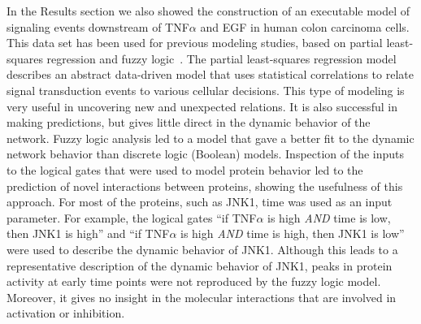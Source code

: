 \documentclass{bmcart}
\begin{document}
In the Results section we also showed the construction of an executable model
of signaling events downstream of
TNF$\alpha$ and EGF in human colon carcinoma cells. This data set has been used for
previous modeling studies, based on partial least-squares regression and fuzzy 
logic~\cite{pathway-leastsquare,pathway-fuzzy}.
The partial least-squares regression model describes an abstract data-driven model 
that uses statistical correlations
to relate signal transduction events to various cellular decisions. This type of modeling is
very useful in uncovering new and unexpected relations. It is also successful in making
predictions, but gives little direct in the dynamic behavior of the network. Fuzzy
logic analysis led to a model that gave a better fit to the dynamic network behavior than
discrete logic (Boolean) models. Inspection of the inputs to the logical gates that were used
to model protein behavior led to the prediction of novel interactions between proteins,
showing the usefulness of this approach. For most of the proteins, such as JNK1, time was
used as an input parameter. For example, the logical gates ``if TNF$\alpha$ is high
\emph{AND} time is low, then JNK1 is high'' and ``if TNF$\alpha$ is high \emph{AND} time is
high, then JNK1 is low'' were used to
describe the dynamic behavior of JNK1. Although this leads to a representative
description of the dynamic behavior of JNK1, peaks in protein activity at early time points were
not reproduced by the fuzzy logic model. Moreover, it gives no insight in the molecular interactions 
that are involved in activation or inhibition.
\end{document}
